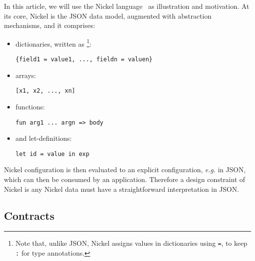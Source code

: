 \documentclass[sigplan,screen,10pt]{acmart}
\newcommand{\resolved}[2]{}
\newcommand{\nickel}[1]{\lstinline[language=nickel]{#1}}
\begin{document}
In this article, we will use the Nickel language~\cite{NickelRepo} as
illustration and motivation. At its core, Nickel is the JSON data
model, augmented with abstraction mechanisms, and it comprises:

\begin{itemize}
  \item dictionaries, written as
    \footnote{Note that, unlike JSON, Nickel assigns values in
    dictionaries using \nickel{=}, to keep \nickel{:} for type
annotations.}:
\begin{lstlisting}[frame=none,numbers=none,language=nickel]
{field1 = value1, ..., fieldn = valuen}
\end{lstlisting}
  \item arrays:
\begin{lstlisting}[frame=none,numbers=none,language=nickel]
[x1, x2, ..., xn]
\end{lstlisting}
  \item functions:
\begin{lstlisting}[frame=none,numbers=none,language=nickel]
fun arg1 ... argn => body
\end{lstlisting}
  \item and let-definitions:
\begin{lstlisting}[frame=none,numbers=none,language=nickel]
let id = value in exp
\end{lstlisting}
\end{itemize}

\resolved{Arnaud: this
  paragraph looks kind of bad, maybe it'll be better to put each
  syntax entry in an enumeration, we will see if there is still room
  for this
  Teo: Tried to enumerate the constructs, left the original commented}

A Nickel configuration is then evaluated to an explicit configuration,
\emph{e.g.}  in JSON, which can then be consumed by an
application. Therefore a design constraint of Nickel is any Nickel
data must have a straightforward interpretation in JSON.

\subsection{Contracts}
\label{sub-sec:contracts}
\end{document}
